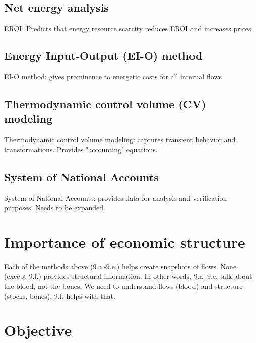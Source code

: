 \subsection{Net energy analysis}
\label{sec:NEA}

EROI: Predicts that energy resource scarcity reduces EROI and increases prices

\subsection{Energy Input-Output (EI-O) method}
\label{sec:EI-O}

EI-O method: gives prominence to energetic costs for all internal flows

\subsection{Thermodynamic control volume (CV) modeling}
\label{sec:CV_modeling}

Thermodynamic control volume modeling: captures transient behavior 
and transformations.  
Provides "accounting" equations.

\subsection{System of National Accounts}
\label{sec:national_accounts}

System of National Accounts: provides data for analysis and verification purposes.  
Needs to be expanded.

\section{Importance of economic structure}
\label{sec:structure}

Each of the methods above (9.a.-9.e.) helps create snapshots of flows.  
None (except 9.f.) provides structural information.  
In other words, 9.a.-9.e. talk about the blood, not the bones. 
We need to understand flows (blood) and structure (stocks, bones). 
9.f. helps with that.

\section{Objective}
\label{sec:objective}

